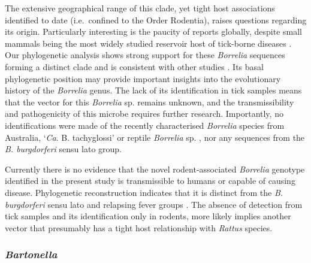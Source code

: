 \documentclass[a4paper, nobind]{templates/ociamthesis}
\begin{document}
The extensive geographical range of this clade, yet tight host associations identified to date (i.e.~confined to the Order Rodentia), raises questions regarding its origin.
Particularly interesting is the paucity of reports globally, despite small mammals being the most widely studied reservoir host of tick-borne diseases \autocite{zikeliWhyResearchLyme2020}.
Our phylogenetic analysis shows strong support for these \emph{Borrelia} sequences forming a distinct clade and is consistent with other studies \autocite{margosControversiesBacterialTaxonomy2019}.
Its basal phylogenetic position may provide important insights into the evolutionary history of the \emph{Borrelia} genus.
The lack of its identification in tick samples means that the vector for this \emph{Borrelia} sp. remains unknown, and the transmissibility and pathogenicity of this microbe requires further research.
Importantly, no identifications were made of the recently characterised \emph{Borrelia} species from Australia, `\emph{Ca}. B. tachyglossi' \autocite{lohMolecularCharacterizationCandidatus2017} or reptile \emph{Borrelia} sp. \autocite{panettaReptileassociatedBorreliaSpecies2017}, nor any sequences from the \emph{B. burgdorferi} sensu lato group.

Currently there is no evidence that the novel rodent-associated \emph{Borrelia} genotype identified in the present study is transmissible to humans or capable of causing disease.
Phylogenetic reconstruction indicates that it is distinct from the \emph{B. burgdorferi} sensu lato and relapsing fever groups \autocite{margosControversiesBacterialTaxonomy2019}.
The absence of detection from tick samples and its identification only in rodents, more likely implies another vector that presumably has a tight host relationship with \emph{Rattus} species.

\hypertarget{bartonella-1}{%
\subsubsection{\texorpdfstring{\emph{Bartonella}}{Bartonella}}\label{bartonella-1}}
\end{document}
